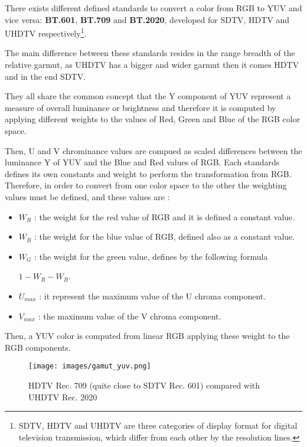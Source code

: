 \documentclass[12pt,a4paper]{extarticle}
\begin{document}
There exists different defined standards to convert a color from RGB to YUV and vice versa: \textbf{BT.601}, \textbf{BT.709} and \textbf{BT.2020}, developed for SDTV, HDTV and  UHDTV respectively\footnote{SDTV, HDTV and UHDTV are three categories of display format for digital television transmission, which differ from each other by the resolution lines.}.

The main difference between these standards resides in the range breadth of the relative garmut, as UHDTV has a bigger and wider garmut then it comes HDTV and in the end SDTV.

They all share the common concept that the Y component of YUV represent a measure of overall luminance or brightness and therefore it is computed by applying different weights to the values of Red, Green and Blue of the RGB color space.

Then, U and V chrominance values are compued as scaled differences between the luminance Y of YUV and the Blue and Red values of RGB.
Each standards defines its own constants and weight to perform the transformation from RGB.
Therefore, in order to convert from one color space to the other the weighting values must be defined, and these values are :
\begin{itemize}
\item $W_{R}$ : the weight for the red value of RGB and it is defined a constant value.
\item $W_{B}$ : the weight for the blue value of RGB, defined also as a constant value.
\item $W_{G}$ : the weight for the green value, defines by the following formula
\begin{center}
$1-W_{R}-W_{B}$.
\end{center}
\item $U_{max}$ : it represent the maximum value of the U chroma component.
\item $V_{max}$ : the maximum value of the V chroma component.
\end{itemize}
Then, a YUV color is computed from linear RGB %
applying these weight to the RGB components.

\begin{figure}[hbtp]
\centering
\texttt{[image: images/gamut\_yuv.png]}
\caption{HDTV Rec. 709 (quite close to SDTV Rec. 601) compared with UHDTV Rec. 2020} 
\end{figure}
\end{document}
